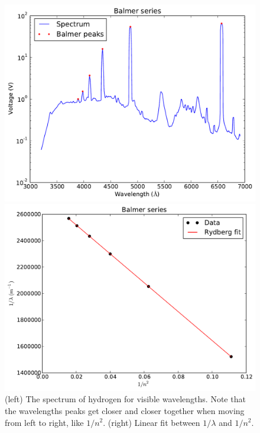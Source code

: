 \documentclass[11pt,letterpaper]{article}
\begin{document}
\begin{figure}
    \centering
    \begin{minipage}[t]{0.45\textwidth}
        \centering
        \includegraphics[width=\textwidth]{figures/hydrogen_spec.pdf}
    \end{minipage}
    \hspace{0.5em}
    \begin{minipage}[t]{0.45\textwidth}
        \centering
        \includegraphics[width=\textwidth]{figures/rydberg.pdf}
    \end{minipage}
    \caption{(left) The spectrum of hydrogen for visible wavelengths. Note that
    the wavelengths peaks get closer and closer together when moving from left
    to right, like $1 / n^2$. (right) Linear fit between $1 / \lambda$ and 
    $1 / n^2$.}
    \label{hydrogen}
\end{figure}
\end{document}
